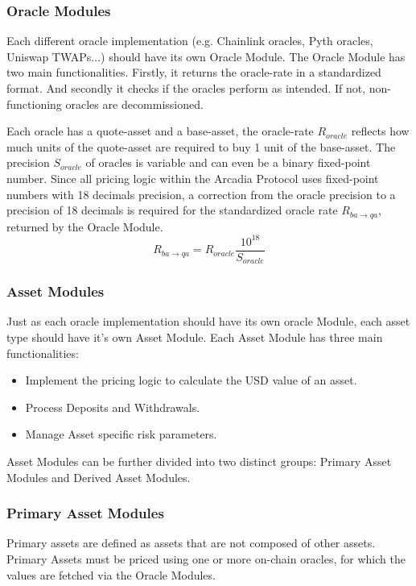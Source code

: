 \documentclass[sigconf,nonacm]{acmart}
\begin{document}
\subsubsection{Oracle Modules}
Each different oracle implementation (e.g. Chainlink oracles, Pyth oracles, Uniswap TWAPs...) should have its own Oracle Module.
The Oracle Module has two main functionalities.
Firstly, it returns the oracle-rate in a standardized format.
And secondly it checks if the oracles perform as intended.
If not, non-functioning oracles are decommissioned.

Each oracle has a quote-asset and a base-asset, the oracle-rate $R_{oracle}$ reflects how much units of the quote-asset are required to buy 1 unit of the base-asset.
The precision $S_{oracle}$ of oracles is variable and can even be a binary fixed-point number.
Since all pricing logic within the Arcadia Protocol uses fixed-point numbers with 18 decimals precision,
a correction from the oracle precision to a precision of 18 decimals is required for the standardized oracle rate $R_{ba\rightarrow qa}$, returned by the Oracle Module.
\begin{equation}
    \label{eq:oracle-module}
    R_{ba\rightarrow qa} = R_{oracle} \frac{10^{18}}{S_{oracle}}
\end{equation}

\subsubsection{Asset Modules}
Just as each oracle implementation should have its own oracle Module, each asset type should have it's own Asset Module.
Each Asset Module has three main functionalities:
\begin{itemize}
    \item Implement the pricing logic to calculate the USD value of an asset. 
    \item Process Deposits and Withdrawals.
    \item Manage Asset specific risk parameters.
\end{itemize}

Asset Modules can be further divided into two distinct groups: Primary Asset Modules and Derived Asset Modules.

\subsubsection{Primary Asset Modules}
Primary assets are defined as assets that are not composed of other assets.
Primary Assets must be priced using one or more on-chain oracles, for which the values are fetched via the Oracle Modules.
\end{document}
